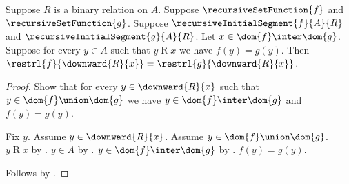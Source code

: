 \begin{proposition}\label{recursive_history_agreement}
    Suppose $R$ is a binary relation on $A$.
    Suppose $\recursiveSetFunction{f}$ and $\recursiveSetFunction{g}$.
    Suppose $\recursiveInitialSegment{f}{A}{R}$ and
        $\recursiveInitialSegment{g}{A}{R}$.
    Let $x\in\dom{f}\inter\dom{g}$.
    Suppose for every $y\in A$ such that $y\mathrel{R}x$ we have
        $f(y)=g(y)$.
    Then
        $\restrl{f}{\downward{R}{x}}=
            \restrl{g}{\downward{R}{x}}$.
\end{proposition}
\begin{proof}
    Show that for every $y\in\downward{R}{x}$ such that
        $y\in\dom{f}\union\dom{g}$ we have
        $y\in\dom{f}\inter\dom{g}$ and $f(y)=g(y)$.
    \begin{subproof}
        Fix $y$.
        Assume $y\in\downward{R}{x}$.
        Assume $y\in\dom{f}\union\dom{g}$.
        $y\mathrel{R}x$ by .
        $y\in A$ by .
        $y\in\dom{f}\inter\dom{g}$ by
            .
        $f(y)=g(y)$.
    \end{subproof}
    Follows by .
\end{proof}


